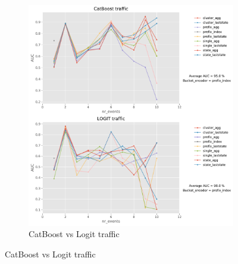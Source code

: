 \documentclass[twoside,11pt]{Latex/Classes/PhDthesisPSnPDF}
\begin{document}
\begin{figure}[t!]
\begin{subfigure}{0.48\textwidth}
		\includegraphics[width=\linewidth]{images/catboost/graphslogit/traffic_CatBoost_logit.pdf}
		\caption{CatBoost vs Logit traffic} \label{fig:trafcl}
	\end{subfigure}
	

\end{figure}
\end{document}
